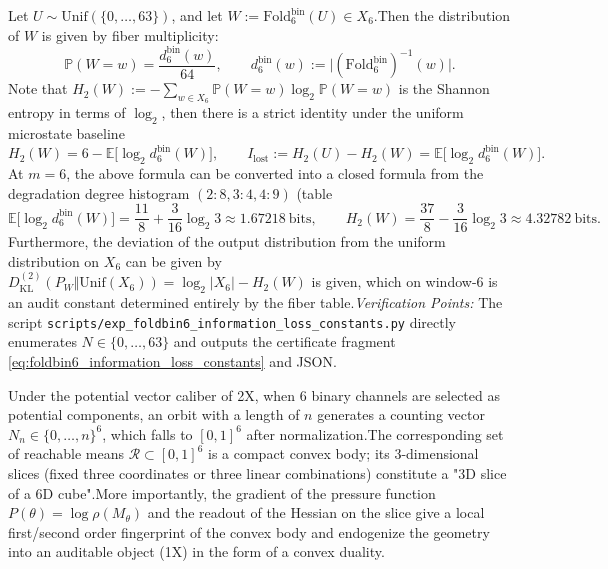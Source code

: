 \begin{enumerate}
\begin{theorem}\label{thm:terminal-foldbin6-information-loss-constants}Let \(U\sim\mathrm{Unif}(\{0,\dots,63\})\), and let \(W:=\mathrm{Fold}^{\mathrm{bin}}_6(U)\in X_6\).Then the distribution of \(W\) is given by fiber multiplicity:  \[
  \mathbb{P}(W=w)=\frac{d^{\mathrm{bin}}_6(w)}{64},\qquad d^{\mathrm{bin}}_6(w):=\bigl|(\mathrm{Fold}^{\mathrm{bin}}_6)^{-1}(w)\bigr|.
  \]
Note that \(H_2(W):=-\sum_{w\in X_6}\mathbb{P}(W=w)\log_2\mathbb{P}(W=w)\) is the Shannon entropy in terms of \(\log_2\), then there is a strict identity under the uniform microstate baseline  \[
  H_2(W)=6-\mathbb{E}\bigl[\log_2 d^{\mathrm{bin}}_6(W)\bigr],
  \qquad
  I_{\mathrm{lost}}:=H_2(U)-H_2(W)=\mathbb{E}\bigl[\log_2 d^{\mathrm{bin}}_6(W)\bigr].
  \]
At \(m=6\), the above formula can be converted into a closed formula from the degradation degree histogram \((2{:}8,3{:}4,4{:}9)\) (table  \[
  \mathbb{E}\bigl[\log_2 d^{\mathrm{bin}}_6(W)\bigr]
  =\frac{11}{8}+\frac{3}{16}\log_2 3
  \approx 1.67218\ \text{bits},
  \qquad
  H_2(W)=\frac{37}{8}-\frac{3}{16}\log_2 3\approx 4.32782\ \text{bits}.
  \]
Furthermore, the deviation of the output distribution from the uniform distribution on \(X_6\) can be given by  \(
  D^{(2)}_{\mathrm{KL}}(P_W\Vert \mathrm{Unif}(X_6))=\log_2|X_6|-H_2(W)
  \)
is given, which on window-\(6\) is an audit constant determined entirely by the fiber table.\emph {Verification Points:} The script \texttt{scripts/exp\_foldbin6\_information\_loss\_constants.py} directly enumerates \(N\in\{0,\dots,63\}\) and outputs the certificate fragment \eqref{eq:foldbin6_information_loss_constants} and JSON.  \end{theorem}
  

\begin{proposition}  \label{prop:terminal-6d-reachable-mean-convex-body}
Under the potential vector caliber of \SXPH2X, when \(6\) binary channels are selected as potential components, an orbit with a length of \(n\) generates a counting vector\(N_n\in\{0,\dots,n\}^6\), which falls to \([0,1]^6\) after normalization.The corresponding set of reachable means \(\mathcal{R}\subset[0,1]^6\) is a compact convex body; its \(3\)-dimensional slices (fixed three coordinates or three linear combinations) constitute a "3D slice of a 6D cube".More importantly, the gradient of the pressure function \(P(\theta)=\log\rho(M_\theta)\) and the readout of the Hessian on the slice give a local first/second order fingerprint of the convex body and endogenize the geometry into an auditable object (\SXPH1X) in the form of a convex duality.  \end{proposition}


\end{enumerate}
